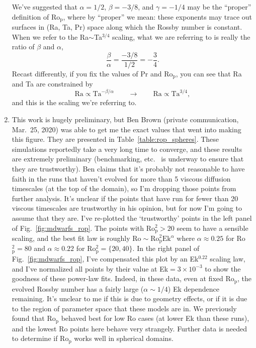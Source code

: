 \documentclass[aps, pre, onecolumn, nofootinbib, notitlepage, groupedaddress, amsfonts, amssymb, amsmath, longbibliography, superscriptaddress]{revtex4-1}
\begin{document}
\begin{enumerate}
We've suggested that $\alpha = 1/2$, $\beta = -3/8$, and $\gamma = -1/4$ may be the ``proper'' definition of Ro$_{\text{p}}$, where by ``proper'' we mean: these exponents may trace out surfaces in (Ra, Ta, Pr) space along which the Rossby number is constant.
When we refer to the Ra$\sim$Ta$^{3/4}$ scaling, what we are referring to is really the ratio of $\beta$ and $\alpha$,
$$
\frac{\beta}{\alpha} = \frac{-3/8}{1/2} = -\frac{3}{4}.
$$
Recast differently, if you fix the values of Pr and Ro$_{\text{p}}$, you can see that Ra and Ta are constrained by
$$
\text{Ra} \propto \text{Ta}^{-\beta/\alpha} \qquad\rightarrow\qquad
\text{Ra} \propto \text{Ta}^{3/4},
$$
and this is the scaling we're referring to.
\item This work is hugely preliminary, but Ben Brown (private communication, Mar.~25, 2020) was able to get me the exact values that went into making this figure.
They are presented in Table~\ref{table:rop_spheres}.
These simulations reportedly take a very long time to converge, and these results are extremely preliminary (benchmarking, etc.~ is underway to ensure that they are trustworthy).
Ben claims that it's probably not reasonable to have faith in the runs that haven't evolved for more than 5 viscous diffusion timescales (at the top of the domain), so I'm dropping those points from further analysis.
It's unclear if the points that have run for fewer than 20 viscous timescales are trustworthy in his opinion, but for now I'm going to assume that they are.
I've re-plotted the `trustworthy' points in the left panel of Fig.~\ref{fig:mdwarfs_rop}.
The points with Ro$_\text{p}^2 > 20$ seem to have a sensible scaling, and the best fit law is roughly $\text{Ro} \sim \text{Ro}_\text{p}^2 \text{Ek}^\alpha$ where $\alpha \approx 0.25$ for Ro$_\text{p}^2 = 80$ and $\alpha \approx 0.22$ for Ro$_\text{p}^2 = \{20, 40\}$.
In the right panel of Fig.~\ref{fig:mdwarfs_rop}, I've compensated this plot by an Ek$^{0.22}$ scaling law, and I've normalized all points by their value at Ek$ = 3 \times 10^{-3}$ to show the goodness of these power-law fits.
Indeed, in these data, even at fixed Ro$_\text{p}$, the evolved Rossby number has a fairly large ($\alpha \sim 1/4$) Ek dependence remaining.
It's unclear to me if this is due to geometry effects, or if it is due to the region of parameter space that these models are in.
We previously found that Ro$_\text{p}$ behaved best for low Ro cases (at lower Ek than these runs), and the lowest Ro points here behave very strangely.
Further data is needed to determine if Ro$_{\text{p}}$ works well in spherical domains.





\end{enumerate}
\end{document}
